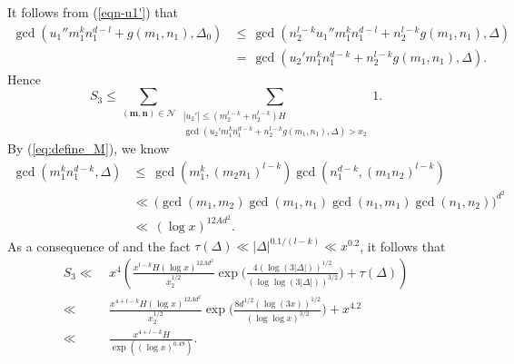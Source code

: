 \documentclass[reqno, 11pt]{amsart}
\renewcommand{\leq}{\leqslant}
\theoremstyle{definition}
\theoremstyle{definition}
\renewcommand{\leq}{\leqslant}
\newcommand{\mm}{\mathbf{m}}
\newcommand{\nn}{\mathbf{n}}
\numberwithin{equation}{section}
\begin{document}
It follows from (\ref{eqn-u1'}) that
\begin{align*}
	\gcd(u_1'' m_1^k n_1^{d-l} + g(m_1,n_1), \Delta_0)  & \leq \, \gcd(n_2^{l-k} u_1'' m_1^k n_1^{d-l} + n_2^{l-k} g(m_1,n_1), \Delta) \\
	& = \, \gcd(u_2' m_1^kn_1^{d-k} + n_2^{l-k} g(m_1,n_1), \Delta).
\end{align*}
Hence
$$S_3 \leq \sum_{(\mm,\nn) \in \mathcal{N}} \sum_{\substack{|u_2'| \leq (m_2^{l-k} + n_2^{l-k}) H \\ \gcd(u_2' m_1^kn_1^{d-k} + n_2^{l-k} g(m_1,n_1), \Delta) > x_2}} 1.$$
By (\ref{eq:define_M}), we know
\begin{align*}
	\gcd(m_1^kn_1^{d-k}, \Delta) & \leq \ \gcd(m_1^k, (m_2n_1)^{l-k}) \gcd(n_1^{d-k}, (m_1n_2)^{l-k}) \\
	& \ll \, \big( \gcd(m_1, m_2) \gcd(m_1, n_1) \gcd(n_1, m_1) \gcd(n_1, n_2) \big) ^{d^2}  \\
	& \ll \, (\log x)^{12Ad^2}.
\end{align*}
As a consequence of \cite[Lemma 2.6]{BST} and the fact $\tau(\Delta) \ll |\Delta|^{0.1/(l-k)} \ll x^{0.2}$, it follows that
\begin{align}\label{sc3-2}
    S_3 \ll & \ x^4 \left( \frac{x^{l-k} H (\log x)^{12Ad^2}}{x_2^{1/2}} \exp\Big( \frac{4(\log (3|\Delta|))^{1/2}}{(\log\log(3|\Delta|))^{3/2}} \Big) + \tau(\Delta) \right) \nonumber \\ 
     \ll & \ \frac{x^{4 +l-k} H (\log x)^{12Ad^2}}{x_2^{1/2}} \exp\Big( \frac{8 d^{1/2} (\log (3x))^{1/2}}{(\log\log x)^{3/2}} \Big) + x^{4.2}  \\ 
     \ll & \ \frac{x^{4+l-k} H}{\exp((\log x)^{0.49})}. \nonumber 
\end{align}
\end{document}
